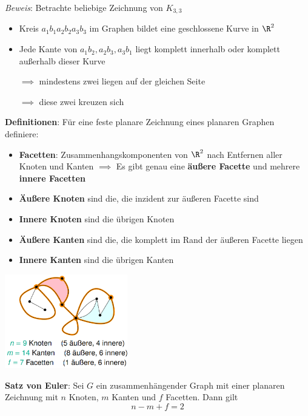 \textit{Beweis}: Betrachte beliebige Zeichnung von $K_{3,3}$
\begin{itemize}
	\item Kreis $a_1b_1a_2b_2a_3b_3$ im Graphen bildet eine geschlossene Kurve in $\R^2$
	\item Jede Kante von $a_1b_2, a_2b_3, a_3b_1$ liegt komplett innerhalb oder komplett außerhalb dieser Kurve
	
	$\implies$ mindestens zwei liegen auf der gleichen Seite
	
	$\implies$ diese zwei kreuzen sich
\end{itemize}
\bigskip
\textbf{Definitionen}: Für eine feste planare Zeichnung eines planaren Graphen definiere:
\begin{itemize}
	\item \textbf{Facetten}: Zusammenhangskomponenten von $\R^2$ nach Entfernen aller Knoten und Kanten $\implies$ Es gibt genau eine \textbf{äußere Facette} und mehrere \textbf{innere Facetten}
	\item \textbf{Äußere Knoten} sind die, die inzident zur äußeren Facette sind
	\item \textbf{Innere Knoten} sind die übrigen Knoten
	\item \textbf{Äußere Kanten} sind die, die komplett im Rand der äußeren Facette liegen 
	\item \textbf{Innere Kanten} sind die übrigen Kanten
\end{itemize}
\begin{center}
	\includegraphics[width=0.4\textwidth]{images/facette.png}
\end{center}
\bigskip
\textbf{Satz von Euler}: Sei $G$ ein zusammenhängender Graph mit einer planaren Zeichnung mit $n$ Knoten, $m$ Kanten und $f$ Facetten. Dann gilt
$$n-m+f=2$$

